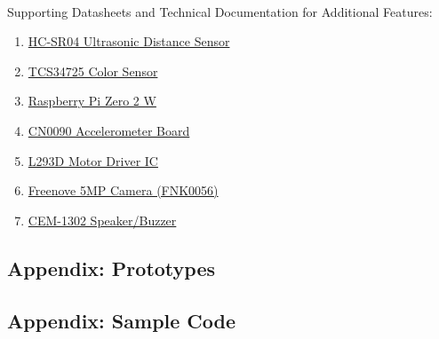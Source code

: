 \documentclass{article}
\begin{document}
\

Supporting Datasheets and Technical Documentation for Additional Features:
\begin{enumerate}
    \item \href{https://cdn.sparkfun.com/datasheets/Sensors/Proximity/HCSR04.pdf}{HC-SR04 Ultrasonic Distance Sensor}
    \item \href{https://cdn-shop.adafruit.com/datasheets/TCS34725.pdf}{TCS34725 Color Sensor}
    \item \href{https://datasheets.raspberrypi.com/rpizero2/raspberry-pi-zero-2-w-product-brief.pdf}{Raspberry Pi Zero 2 W}
    \item \href{https://mm.digikey.com/Volume0/opasdata/d220001/medias/docus/60/CN0090%20DATASHEET.pdf}{CN0090 Accelerometer Board}
    \item \href{https://www.st.com/content/ccc/resource/technical/document/datasheet/d3/84/d5/f6/3c/23/40/7b/CD00001883.pdf/files/CD00001883.pdf/jcr:content/translations/en.CD00001883.pdf}{L293D Motor Driver IC}
    \item \href{https://store.freenove.com/products/fnk0056}{Freenove 5MP Camera (FNK0056)}
    \item \href{https://www.sameskydevices.com/product/resource/cem-1203-42-.pdf?srsltid=AfmBOorbfJiXs7OIBQN95JLHokXYxTFx0Sd8qTPObMLqcfIHXVElk2uz}{CEM-1302 Speaker/Buzzer}
\end{enumerate}

\subsection{Appendix: Prototypes}

\subsection{Appendix: Sample Code}
\end{document}
